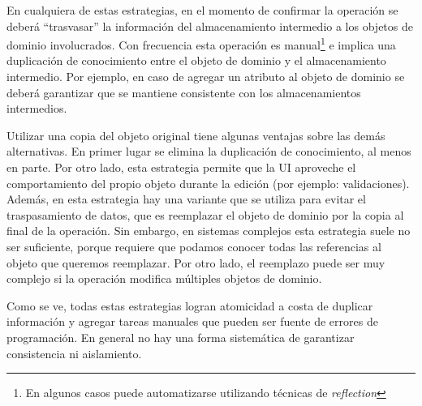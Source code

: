 	En cualquiera de estas estrategias, en el momento de confirmar la operación se
	deberá ``trasvasar'' la información del almacenamiento intermedio a los objetos
	de dominio involucrados.
	Con frecuencia esta operación es manual\footnote{En algunos casos puede automatizarse utilizando
	técnicas de \emph{reflection}} e implica una duplicación de conocimiento entre
	el objeto de dominio y el almacenamiento intermedio. Por ejemplo, en caso de
	agregar un atributo al objeto de dominio se deberá garantizar que se mantiene
	consistente con los almacenamientos intermedios.
	
	Utilizar una copia del objeto original tiene algunas ventajas sobre las demás
	alternativas. En primer lugar se elimina la duplicación de
	conocimiento, al menos en parte. Por otro lado, esta estrategia permite que la
	UI aproveche el comportamiento del propio objeto durante la edición (por
	ejemplo: validaciones). Además, en esta estrategia hay una variante que se
	utiliza para evitar el traspasamiento de datos, que es reemplazar el objeto de
	dominio por la copia al final de la operación. Sin embargo, en sistemas
	complejos esta estrategia suele no ser suficiente, porque requiere que podamos
	conocer todas las referencias al objeto que queremos reemplazar. Por otro lado,
	el reemplazo puede ser muy complejo si la operación modifica múltiples objetos
	de dominio.

	Como se ve, todas estas estrategias logran atomicidad a costa de duplicar
	información y agregar tareas manuales que pueden ser fuente de errores de
	programación. En general no hay una forma sistemática de
	garantizar consistencia ni aislamiento.
	